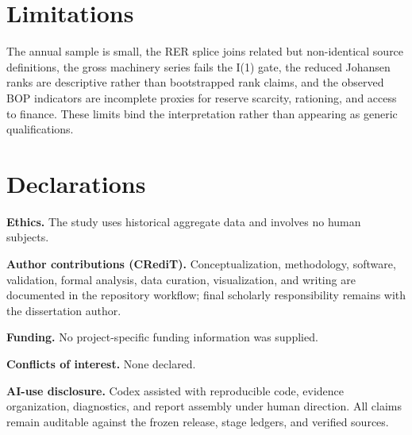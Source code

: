 \documentclass[11pt]{article}
\begin{document}
\FloatBarrier
\section*{Limitations}

The annual sample is small, the RER splice joins related but non-identical source definitions, the gross machinery series fails the I(1) gate, the reduced Johansen ranks are descriptive rather than bootstrapped rank claims, and the observed BOP indicators are incomplete proxies for reserve scarcity, rationing, and access to finance. These limits bind the interpretation rather than appearing as generic qualifications.

\FloatBarrier
\section*{Declarations}

\textbf{Ethics.} The study uses historical aggregate data and involves no human subjects.

\textbf{Author contributions (CRediT).} Conceptualization, methodology, software, validation, formal analysis, data curation, visualization, and writing are documented in the repository workflow; final scholarly responsibility remains with the dissertation author.

\textbf{Funding.} No project-specific funding information was supplied.

\textbf{Conflicts of interest.} None declared.

\textbf{AI-use disclosure.} Codex assisted with reproducible code, evidence organization, diagnostics, and report assembly under human direction. All claims remain auditable against the frozen release, stage ledgers, and verified sources.
\end{document}

